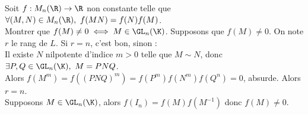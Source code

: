 \documentclass[11pt]{article}
\begin{document}
\vspace*{-0.4cm}

\begin{exercice}{}{}
    Soit $f:M_n(\R)\to\R$ non constante telle que $\forall(M,N)\in M_n(\R), ~ f(MN)=f(N)f(M)$.\\
    Montrer que $f(M)\neq0\iff M\in \GL_n(\K)$.
    \tcblower
    \boxed{\ra} Supposons que $f(M)\neq0$. On note $r$ le rang de $L$. Si $r=n$, c'est bon, sinon :\\
    Il existe $N$ nilpotente d'indice $m>0$ telle que $M\sim N$, donc $\exists P,Q\in\GL_n(\K), ~ M=PNQ$.\\
    Alors $f(M^m)=f((PNQ)^m)=f(P^m)f(N^m)f(Q^n)=0$, absurde. Alors $r=n$.\\
    \boxed{\la} Supposons $M\in\GL_n(\K)$, alors $f(I_n)=f(M)f(M^{-1})$ donc $f(M)\neq0$. 
\end{exercice}
\end{document}
